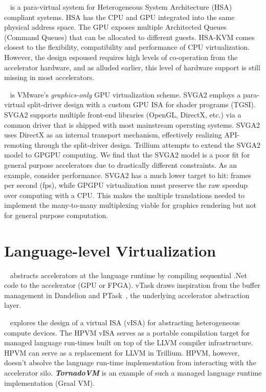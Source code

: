 ~\cite{kaveri16vee} is a para-virtual system for
Heterogeneous System Architecture (HSA) compliant systems. HSA has the CPU and
GPU integrated into the same physical address space. The GPU exposes multiple
Architected Queues (Command Queues) that can be allocated to different guests.
HSA-KVM comes closest to the flexibility, compatibility and performance of CPU
virtualization. However, the design espoused requires high levels of
co-operation from the accelerator hardware, and as alluded earlier, this level
of hardware support is still missing in most accelerators.

~\cite{dowty2009gpu} is VMware's \emph{graphics-only} GPU
virtualization scheme. SVGA2 employs a para-virtual split-driver design with a
custom GPU ISA for shader programs (TGSI). SVGA2 supports multiple front-end
libraries (OpenGL, DirectX, etc.) via a common driver that is shipped with
most mainstream operating systems. SVGA2 uses DirectX as an internal transport
mechanism, effectively realizing API-remoting through the split-driver design.
Trillium attempts to extend the SVGA2 model to GPGPU computing. We find that
the SVGA2 model is a poor fit for general purpose accelerators due to
drastically different constraints. As an example, consider performance. SVGA2
has a much lower target to hit: frames per second (fps), while GPGPU
virtualization must preserve the raw speedup over computing with a CPU.
This makes the multiple translations needed to implement the many-to-many
multiplexing viable for graphics rendering but not for general purpose
computation.

\section{Language-level Virtualization}
~\cite{dandelion} abstracts accelerators at the
language runtime by compiling sequential .Net code to the accelerator
(GPU or FPGA). vTask draws inspiration from the buffer management in Dandelion
and PTask~\cite{rossbach2011ptask}, the underlying accelerator abstraction
layer.

~\cite{HPVM} explores the design of a virtual ISA
(vISA) for abstracting heterogeneous compute devices. The HPVM vISA serves as
a portable compilation target for managed language run-times built on top of
the LLVM compiler infrastructure. HPVM can serve as a replacement for LLVM in
Trillium. HPVM, however, doesn't absolve the language run-time implementation
from interacting with the accelerator silo. \textbf{\textit{TornadoVM}} is an
example of such a managed language runtime implementation (Graal VM).